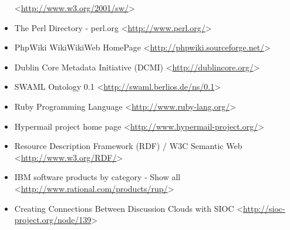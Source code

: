 \begin{itemize}
 <\url{http://www.w3.org/2001/sw/}>
 \item The Perl Directory - perl.org
 <\url{http://www.perl.org/}>
 \item PhpWiki WikiWikiWeb HomePage
 <\url{http://phpwiki.sourceforge.net/}>
 \item Dublin Core Metadata Initiative (DCMI)
 <\url{http://dublincore.org/}>
 \item SWAML Ontology 0.1
 <\url{http://swaml.berlios.de/ns/0.1}>
 \item Ruby Programming Language
 <\url{http://www.ruby-lang.org/}>
 \item Hypermail project home page
 <\url{http://www.hypermail-project.org/}>
 \item Resource Description Framework (RDF) / W3C Semantic Web
 <\url{http://www.w3.org/RDF/}>
 \item IBM software products by category - Show all
 <\url{http://www.rational.com/products/rup/}>
 \item Creating Connections Between Discussion Clouds with SIOC
 <\url{http://sioc-project.org/node/139}>
\end{itemize}
